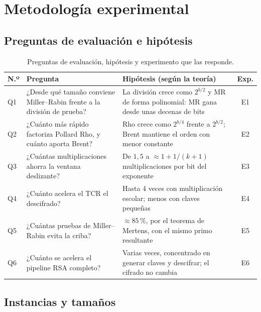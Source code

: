 \section{Metodología experimental}
\label{sec:metodologia}

\subsection{Preguntas de evaluación e hipótesis}

\begin{table}[H]
\centering\small
\caption{Preguntas de evaluación, hipótesis y experimento que las responde.}
\label{tab:preguntas}
\begin{tabularx}{\linewidth}{@{}l Y Y c@{}}
\toprule
\textbf{N.º} & \textbf{Pregunta} & \textbf{Hipótesis (según la teoría)} & \textbf{Exp.}\\
\midrule
Q1 & ¿Desde qué tamaño conviene Miller--Rabin frente a la división de prueba? & La división crece como $2^{b/2}$ y MR de forma polinomial: MR gana desde unas decenas de bits & E1\\
Q2 & ¿Cuánto más rápido factoriza Pollard Rho, y cuánto aporta Brent? & Rho crece como $2^{b/4}$ frente a $2^{b/2}$; Brent mantiene el orden con menor constante & E2\\
Q3 & ¿Cuántas multiplicaciones ahorra la ventana deslizante? & De $1{,}5$ a $\approx 1 + 1/(k+1)$ multiplicaciones por bit del exponente & E3\\
Q4 & ¿Cuánto acelera el TCR el descifrado? & Hasta 4 veces con multiplicación escolar; menos con claves pequeñas & E4\\
Q5 & ¿Cuántas pruebas de Miller--Rabin evita la criba? & $\approx 85\,\%$, por el teorema de Mertens, con el mismo primo resultante & E5\\
Q6 & ¿Cuánto se acelera el pipeline RSA completo? & Varias veces, concentrado en generar claves y descifrar; el cifrado no cambia & E6\\
\bottomrule
\end{tabularx}
\end{table}

\subsection{Instancias y tamaños}

